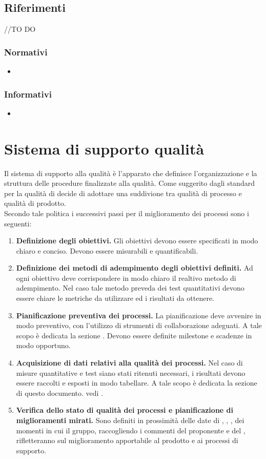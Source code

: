 \documentclass[12pt,a4paper]{article}
\begin{document}
\subsection{Riferimenti}
//TO DO \AB
\subsubsection{Normativi}
\begin{itemize}
	\item \NdP
\end{itemize}
\subsubsection{Informativi}
\begin{itemize}
	\item \PdP
\end{itemize}
\newpage
\section{Sistema di supporto qualità}
Il sistema di supporto alla qualità è l'apparato che definisce l'organizzazione e la struttura delle procedure finalizzate alla qualità. Come suggerito dagli standard per la qualità di decide di adottare una suddivione tra qualità di processo e qualità di prodotto. \\
Secondo tale politica i successivi passi per il miglioramento dei processi sono i seguenti: 

\begin{enumerate}
	\item \textbf {Definizione degli obiettivi.} Gli obiettivi devono essere specificati in modo chiaro e conciso. Devono essere misurabili e quantificabili.
	\item \textbf{Definizione dei metodi di adempimento degli obiettivi definiti.} Ad ogni obiettivo deve corrispondere in modo chiaro il realtivo metodo di adempimento. Nel caso tale metodo preveda dei test quantitativi devono essere chiare le metriche da utilizzare ed i risultati da ottenere.
	\item \textbf{Pianificazione preventiva dei processi.} La pianificazione deve avvenire in modo preventivo, con l'utilizzo di strumenti di collaborazione adeguati. A tale scopo è dedicata la sezione \NdP. Devono essere definite milestone e scadenze in modo opportuno.  
	\item \textbf{Acquisizione di dati relativi alla qualità dei processi.} Nel caso di misure quantitative e test siano stati ritenuti necessari, i risultati devono essere raccolti e esposti in modo tabellare. A tale scopo è dedicata la sezione di questo documento. vedi \PdQ.
	
	\item \textbf{Verifica dello stato di qualità dei processi e pianificazione di miglioramenti mirati.}
	Sono definiti in prossimità delle date di \RR, \RA, \RP, \RQ dei momenti in cui il gruppo, raccogliendo i commenti del proponente \Zucchetti e del \Vardanega, rifletteranno sul miglioramento apportabile al prodotto e ai processi di supporto.
	
\end{enumerate}
\end{document}
